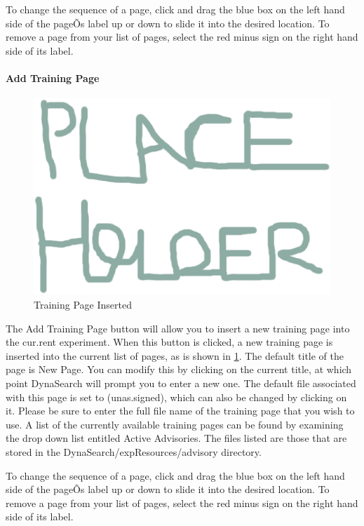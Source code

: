 \documentclass[article]{ij4uq}              %
\begin{document}
To change the sequence of a page, click and drag the blue box on the left hand side of the pageÕs label up or down to slide it into the desired location. To remove a page from your list of pages, select the red minus sign on the right hand side of its label.

\paragraph{Add Training Page}

\begin{figure}[h!]
 \centering
 \includegraphics[width=5.0in]{figures/place.eps}
 \caption{Training Page Inserted}
 \label{fig:trainInsert}
\end{figure}
\FloatBarrier

The Add Training Page button will allow you to insert a new training page into the cur.rent experiment. When this button is clicked, a new training page is inserted into the current list of pages, as is shown in \ref{fig:trainInsert}. The default title of the page is New Page. You can modify this by clicking on the current title, at which point DynaSearch will prompt you to enter a new one. The default file associated with this page is set to (unas.signed), which can also be changed by clicking on it. Please be sure to enter the full file name of the training page that you wish to use. A list of the currently available training pages can be found by examining the drop down list entitled Active Advisories. The files listed are those that are stored in the DynaSearch/expResources/advisory directory.

To change the sequence of a page, click and drag the blue box on the left hand side of the pageÕs label up or down to slide it into the desired location. To remove a page from your list of pages, select the red minus sign on the right hand side of its label.
\end{document}
